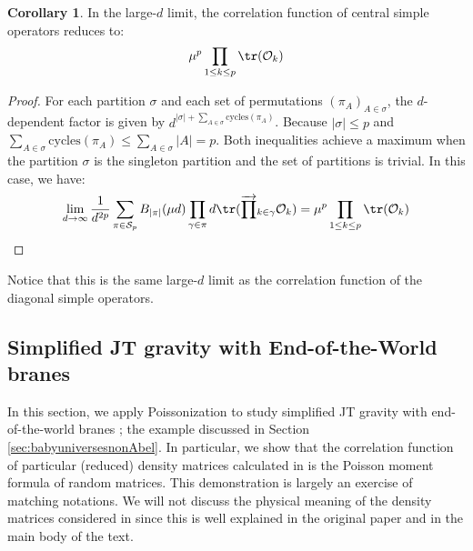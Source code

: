 \documentclass[a4paper,11pt]{article}
\theoremstyle{definition}
\numberwithin{equation}{section}
\newtheorem{corollary}[lemma]{Corollary}
\begin{document}
\begin{corollary}
    In the large-$d$ limit, the correlation function of central simple operators reduces to:
    \begin{equation}
        \mu^p\prod_{1\leq k\leq p}\tr(\mathcal{O}_k)
    \end{equation}
\end{corollary}
\begin{proof}
    For each partition $\sigma$ and each set of permutations $(\pi_A)_{A\in\sigma}$, the $d$-dependent factor is given by $d^{|\sigma| + \sum_{A\in\sigma}\text{cycles}(\pi_A)}$. Because $|\sigma| \leq p$ and $\sum_{A\in\sigma}\text{cycles}(\pi_A) \leq \sum_{A\in\sigma}|A| = p$. Both inequalities achieve a maximum when the partition $\sigma$ is the singleton partition and the set of partitions is trivial. In this case, we have:
    \begin{equation}
        \lim_{d\rightarrow\infty}\frac{1}{d^{2p}}\sum_{\pi\in\mathcal{S}_p}B_{|\pi|}(\mu d)\prod_{\gamma\in\pi}d\tr(\overrightarrow{\prod}_{k\in\gamma}\mathcal{O}_k) = \mu^p\prod_{1\leq k\leq p}\tr(\mathcal{O}_k)\qedhere
    \end{equation}
\end{proof}
Notice that this is the same large-$d$ limit as the correlation function of the diagonal simple operators.  

\subsection{Simplified JT gravity with End-of-the-World branes}\label{subsection:mathJTEOW}

In this section, we apply Poissonization to study simplified JT gravity with end-of-the-world branes \cite{Penington:2019kki}; the example discussed in Section \ref{sec:babyuniversesnonAbel}. In particular, we show that the correlation function of particular (reduced) density matrices calculated in \cite{Penington:2019kki} is the Poisson moment formula of random matrices. This demonstration is largely an exercise of matching notations. We will not discuss the physical meaning of the density matrices considered in \cite{Penington:2019kki} since this is well explained in the original paper and in the main body of the text.
\end{document}
